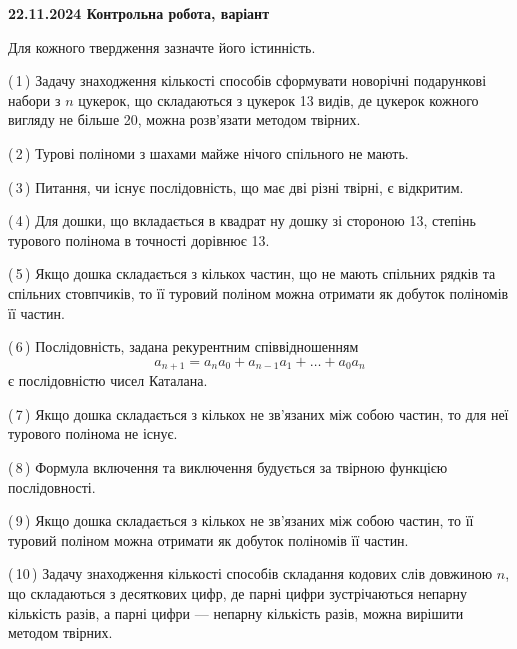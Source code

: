 \documentclass[12pt, ukrainian]{article}
\begin{document}
\begin {large}

\textbf{22.11.2024 Контрольна робота, варіант  }\par


{
Для кожного твердження зазначте його істинність.\par

\vspace{2mm}

(\,1\,) Задачу знаходження кількості способів сформувати новорічні подарункові набори з $n$ цукерок, що складаються з цукерок 13 видів, де цукерок кожного вигляду не більше 20, можна розв’язати методом твірних.%



(\,2\,) Турові поліноми з шахами майже нічого спільного не мають.%



(\,3\,) Питання, чи існує послідовність, що має дві різні твірні, є відкритим.%



(\,4\,) Для дошки, що вкладається в квадрат ну дошку зі стороною 13, степінь турового полінома в точності дорівнює 13.%



(\,5\,) Якщо дошка складається з кількох частин, що не мають спільних рядків та спільних стовпчиків, то її туровий поліном можна отримати як добуток поліномів її частин.%



(\,6\,) Послідовність, задана рекурентним співвідношенням $$a_{n+1}=a_{n}a_{0}+a_{n-1}a_{1}+\ldots+a_0a_{n}$$ є послідовністю чисел Каталана.%



(\,7\,) Якщо дошка складається з кількох не зв’язаних між собою частин, то для неї турового полінома не існує.%



(\,8\,) Формула включення та виключення будується за твірною функцією послідовності.%



(\,9\,) Якщо дошка складається з кількох не зв’язаних між собою частин, то її туровий поліном можна отримати як добуток поліномів її частин.%



(\,10\,) Задачу знаходження кількості способів складання кодових слів довжиною $n$, що складаються з десяткових цифр, де парні цифри зустрічаються непарну кількість разів, а парні цифри — непарну кількість разів, можна вирішити методом твірних.%




}
\end{large}
\end{document}
